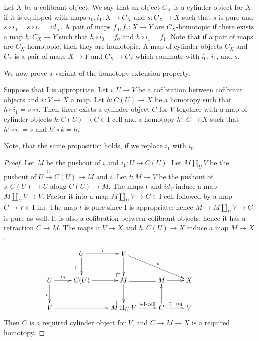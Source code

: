 \documentclass{amsart}
\makeatletter
\theoremstyle{definition}
\newcommand{\I}{\mathrm{I}}
\newcommand{\class}[2]{#1\text{-}\mathrm{#2}}
\newcommand{\Iinj}[1][\I]{\class{#1}{inj}}
\newcommand{\Icell}[1][\I]{\class{#1}{cell}}
\newcommand{\cyli}{i}
\newcommand{\po}[1][dr]{\save*!/#1+1.2pc/#1:(1,-1)@^{|-}\restore}
\makeatother
\begin{document}
Let $X$ be a cofibrant object.
We say that an object $C_X$ is a cylinder object for $X$ if it is equipped with maps $\cyli_0,\cyli_1 : X \to C_X$
and $s : C_X \to X$ such that $s$ is pure and $s \circ \cyli_0 = s \circ \cyli_1 = id_X$.
A pair of maps $f_0,f_1 : X \to Y$ are $C_X$-homotopic if there exists a map
$h : C_X \to Y$ such that $h \circ \cyli_0 = f_0$ and $h \circ \cyli_1 = f_1$.
Note that if a pair of maps are $C_X$-homotopic, then they are homotopic.
A map of cylinder objects $C_X$ and $C_Y$ is a pair of maps $X \to Y$
and $C_X \to C_Y$ which commute with $\cyli_0$, $\cyli_1$, and $s$.

We now prove a variant of the homotopy extension property.

\begin{prop}
Suppose that $\I$ is appropriate.
Let $i : U \to V$ be a cofibration between cofibrant objects and $v : V \to X$ a map.
Let $h : C(U) \to X$ be a homotopy such that $h \circ \cyli_1 = v \circ i$.
Then there exists a cylinder object $C$ for $V$ together with a map of cylinder objects
$k : C(U) \to C \in \Icell$ and a homotopy $h' : C \to X$ such that $h' \circ \cyli_1 = v$ and $h' \circ k = h$.
\end{prop}
Note, that the same proposition holds, if we replace $\cyli_1$ with $\cyli_0$.
\begin{proof}
Let $M$ be the pushout of $i$ and $\cyli_1 : U \to C(U)$.
Let $M \amalg_U V$ be the pushout of $U \overset{\cyli_0}\to C(U) \to M$ and $i$.
Let $t : M \to V$ be the pushout of $s : C(U) \to U$ along $C(U) \to M$.
The maps $t$ and $id_V$ induce a map $M \amalg_U V \to V$.
Factor it into a map $M \amalg_U V \to C \in \Icell$ followed by a map $C \to V \in \Iinj$.
The map $t$ is pure since $\I$ is appropriate; hence $M \to M \amalg_U V \to C$ is pure as well.
It is also a cofibration between cofibrant objects, hence it has a retraction $C \to M$.
The maps $v : V \to X$ and $h : C(U) \to X$ induce a map $M \to X$.
\[ \xymatrix{                              & U \ar[r]^i \ar[d]_{\cyli_1} & V \ar[d] \ar[drr]^v     &          &         & \\
              U \ar[r]^-{\cyli_0} \ar[d]_i & C(U) \ar[r]                 & \po M \ar[d] \ar@{=}[r] & M \ar[r] & X       & \\
              V \ar[rr]                    &      & \po M \amalg_U V \ar[r]^-{\in \Icell} & C \ar[r]^{\in \Iinj} \ar[u] & V
            } \]
Then $C$ is a required cylinder object for $V$, and $C \to M \to X$ is a required homotopy.
\end{proof}
\end{document}
